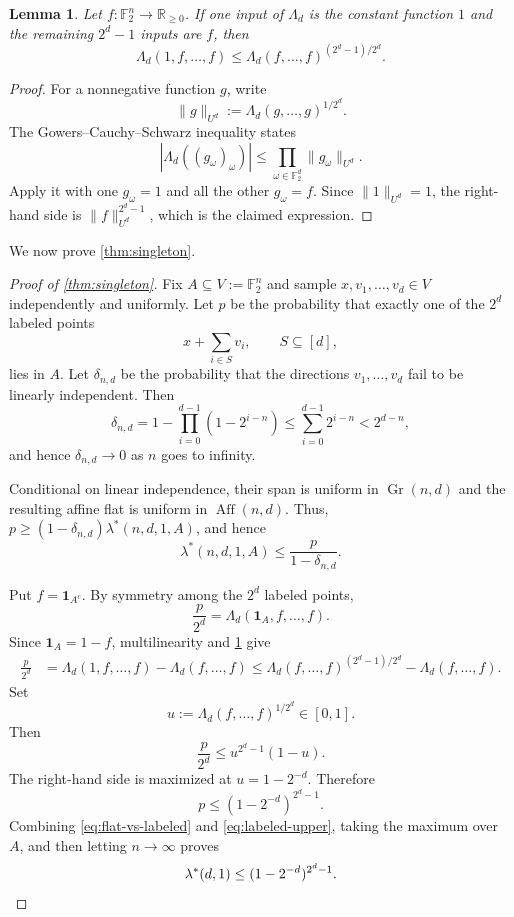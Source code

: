 \documentclass[reqno]{amsart}
\newtheorem{lemma}[theorem]{Lemma}
\theoremstyle{definition}
\theoremstyle{remark}
\newcommand{\F}{\mathbb F}
\newcommand{\R}{\mathbb R}
\newcommand{\one}{\mathbf 1}
\DeclareMathOperator{\Aff}{Aff}
\DeclareMathOperator{\Gr}{Gr}
\begin{document}
\begin{lemma}\label{lem:gcs}
Let $f:\F_2^n\to\R_{\ge0}$.  If one input of $\Lambda_d$ is the
constant function $1$ and the remaining $2^d-1$ inputs are $f$, then
\[
  \Lambda_d(1,f,\ldots,f)
  \le \Lambda_d(f,\ldots,f)^{(2^d-1)/2^d}.
\]
\end{lemma}

\begin{proof}
For a nonnegative function $g$, write
\[
  \|g\|_{U^d}:=\Lambda_d(g,\ldots,g)^{1/2^d}.
\]
The Gowers--Cauchy--Schwarz inequality states
\[
  |\Lambda_d((g_\omega)_\omega)|
  \le\prod_{\omega\in\F_2^d}\|g_\omega\|_{U^d}.
\]
Apply it with one $g_\omega=1$ and all the other
$g_\omega=f$.  Since $\|1\|_{U^d}=1$, the right-hand side is
$\|f\|_{U^d}^{2^d-1}$, which is the claimed expression.
\end{proof}


We now prove \cref{thm:singleton}. 

\begin{proof}[Proof of \cref{thm:singleton}]
    
Fix $A\subseteq V:=\F_2^n$ and
sample $x,v_1,\ldots,v_d\in V$ independently and uniformly. Let
$p$ be the probability that exactly one of the $2^d$ labeled
points
\[
  x+\sum_{i\in S}v_i,\qquad S\subseteq[d],
\]
lies in $A$. Let $\delta_{n,d}$ be the probability that the directions
$v_1,\ldots,v_d$ fail to be linearly independent. Then
\begin{equation}\label{eq:degenerate-probability}
  \delta_{n,d}
  =1-\prod_{i=0}^{d-1}(1-2^{i-n})
  \le\sum_{i=0}^{d-1}2^{i-n}<2^{d-n},
\end{equation}
and hence $\delta_{n,d}\rightarrow 0$ as $n$ goes to infinity.

Conditional on linear independence, their span is uniform in
$\Gr(n,d)$ and the resulting affine flat is uniform in $\Aff(n,d)$.
Thus, $p\ge(1-\delta_{n,d})\lambda^*(n,d,1,A)$, and hence
\begin{equation}\label{eq:flat-vs-labeled}
  \lambda^*(n,d,1,A)\le\frac{p}{1-\delta_{n,d}}.
\end{equation}

Put $f=\one_{A^c}$. By symmetry among the $2^d$ labeled points,
\[
  \frac{p}{2^d}
  =\Lambda_d(\one_A,f,\ldots,f).
\]
Since $\one_A=1-f$, multilinearity and \cref{lem:gcs} give
\begin{align*}
  \frac{p}{2^d}
  &=\Lambda_d(1,f,\ldots,f)-\Lambda_d(f,\ldots,f)\le
  \Lambda_d(f,\ldots,f)^{(2^d-1)/2^d}
  -\Lambda_d(f,\ldots,f).
\end{align*}
Set
\[
  u:=\Lambda_d(f,\ldots,f)^{1/2^d}\in[0,1].
\]
Then
\[
  \frac{p}{2^d}\le u^{2^d-1}(1-u).
\]
The right-hand side is maximized at $u=1-2^{-d}$.  Therefore
\begin{equation}\label{eq:labeled-upper}
  p\le(1-2^{-d})^{2^d-1}.
\end{equation}
Combining \eqref{eq:flat-vs-labeled} and
\eqref{eq:labeled-upper}, taking the maximum over $A$, and then letting
$n\to\infty$ proves
\[
  \lambda^*(d,1)\le(1-2^{-d})^{2^d-1}.\qedhere
\]


\end{proof}


\printbibliography
\end{document}
